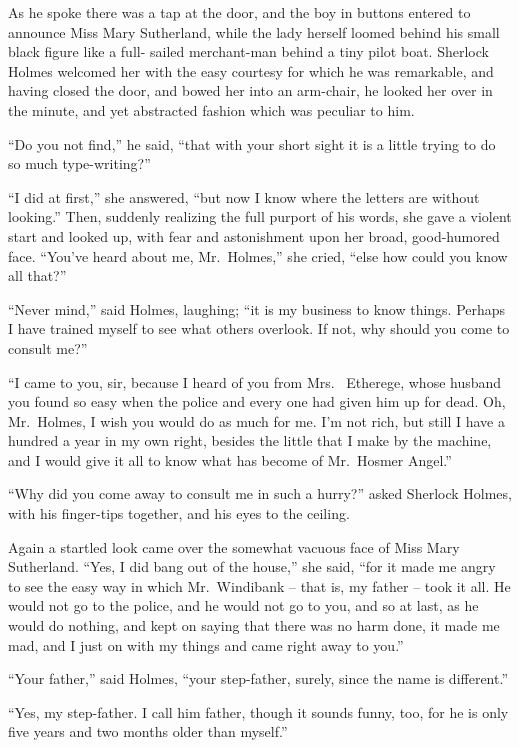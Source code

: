 As he spoke there was a tap at the door, and the boy in
buttons entered to announce Miss Mary Sutherland, while the
lady herself loomed behind his small black figure like a full-%
sailed merchant-man behind a tiny pilot boat. Sherlock
Holmes welcomed her with the easy courtesy for which he was
remarkable, and having closed the door, and bowed her into
an arm-chair, he looked her over in the minute, and yet abstracted
fashion which was peculiar to him.

“Do you not find,” he said, “that with your short sight it
is a little trying to do so much type-writing?”

“I did at first,” she answered, “but now I know where the
letters are without looking.” Then, suddenly realizing the
full purport of his words, she gave a violent start and looked
up, with fear and astonishment upon her broad, good-humored
face. “You’ve heard about me, Mr.~Holmes,” she cried, “else
how could you know all that?”

“Never mind,” said Holmes, laughing; “it is my business
to know things. Perhaps I have trained myself to see what
others overlook. If not, why should you come to consult me?”

“I came to you, sir, because I heard of you from Mrs.\ %
Etherege, whose husband you found so easy when the police
and every one had given him up for dead. Oh, Mr.~Holmes,
I wish you would do as much for me. I’m not rich, but still
I have a hundred a year in my own right, besides the little
that I make by the machine, and I would give it all to know
what has become of Mr.~Hosmer Angel.”

“Why did you come away to consult me in such a hurry?”
asked Sherlock Holmes, with his finger-tips together, and his
eyes to the ceiling.

Again a startled look came over the somewhat vacuous face
of Miss Mary Sutherland. “Yes, I did bang out of the house,”
she said, “for it made me angry to see the easy way in which
Mr.~Windibank -- that is, my father -- took it all. He would
not go to the police, and he would not go to you, and so at
last, as he would do nothing, and kept on saying that there
was no harm done, it made me mad, and I just on with my
things and came right away to you.”

“Your father,” said Holmes, “your step-father, surely, since
the name is different.”

“Yes, my step-father. I call him father, though it sounds
funny, too, for he is only five years and two months older
than myself.”

